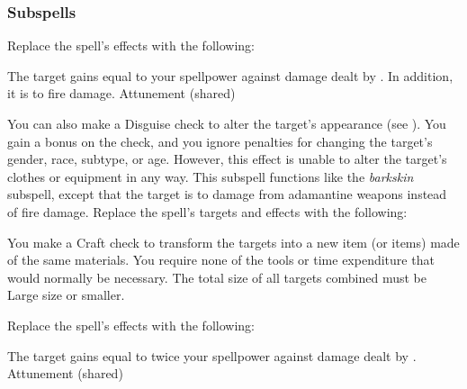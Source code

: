 \subsubsection{Subspells}
Replace the spell's effects with the following:
\begin{spellcontent}
\begin{augmenteffects}
\spelleffect
The target gains  equal to your spellpower against damage dealt by .
In addition, it is  to fire damage.
\spelldur Attunement (shared)
\end{augmenteffects}
\end{spellcontent}
You can also make a Disguise check to alter the target's appearance (see ).
You gain a  bonus on the check, and you ignore penalties for changing the target's gender, race, subtype, or age.
However, this effect is unable to alter the target's clothes or equipment in any way.
This subspell functions like the \textit{barkskin} subspell, except that the target is  to damage from adamantine weapons instead of fire damage.
Replace the spell's targets and effects with the following:
\begin{spellcontent}
\begin{augmenttargetinginfo}
\end{augmenttargetinginfo}
\begin{augmenteffects}
\spelleffect
You make a Craft check to transform the targets into a new item (or items) made of the same materials.
You require none of the tools or time expenditure that would normally be necessary.
The total size of all targets combined must be Large size or smaller.
\end{augmenteffects}
\end{spellcontent}
Replace the spell's effects with the following:
\begin{spellcontent}
\begin{augmenteffects}
\spelleffect
The target gains  equal to twice your spellpower against damage dealt by .
\spelldur Attunement (shared)
\end{augmenteffects}
\end{spellcontent}
